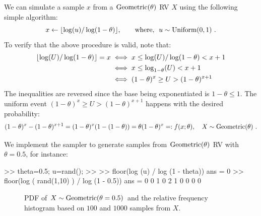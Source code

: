 \begin{simulation}[$\geometric(\theta)$]\label{SIM:Geometric}
We can simulate a sample $x$ from a $\geometric(\theta)$ RV $X$ using the following simple algorithm:
\[
x \gets \lfloor \log(u) / \log(1-\theta) \rfloor, \qquad \text{where, } \ u \sim \uniform(0,1) \ .
\]
To verify that the above procedure is valid, note that:
\begin{align}
\lfloor \log(U) / \log(1-\theta) \rfloor = x
& \iff x \leq  \log(U) / \log(1-\theta) < x+1 \notag \\
& \iff x \leq  \log_{1-\theta}(U) < x+1 \notag \\
& \iff (1-\theta)^x \geq U > (1-\theta) ^{x+1} \notag
\end{align}
The inequalities are reversed since the base being exponentiated is $1-\theta \leq 1$.  The uniform event $(1-\theta)^x \geq U > (1-\theta) ^{x+1}$ happens with the desired probability:
$$(1-\theta) ^{x}-(1-\theta) ^{x+1} = (1-\theta) ^{x}(1-(1-\theta)) = \theta (1-\theta) ^{x} =: f(x;\theta), \quad X \sim \mbox{{\rm Geometric}}(\theta) \ .$$

We implement the sampler to generate samples from $\geometric(\theta)$ RV with $\theta=0.5$, for instance:
\begin{VrbM}
>> theta=0.5; u=rand(); %
>> %
>> floor(log (u) / log (1 - theta))
ans =     0
>> floor(log ( rand(1,10) ) / log (1 - 0.5)) %
ans =     0     0     1     0     2     1     0     0     0     0
\end{VrbM}
\end{simulation}

\begin{figure}[htpb]
\caption{PDF of $X \sim \mbox{{\rm Geometric}}(\theta=0.5)$ and the relative frequency histogram based on $100$ and $1000$ samples from $X$.\label{F:PlotPdfSimHistGeomthetaHalf}}
\centering   {}
\end{figure}


